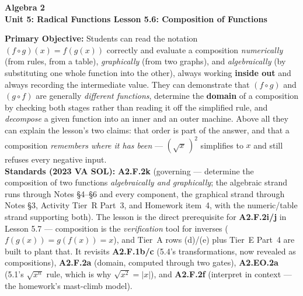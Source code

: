\documentclass[10pt]{article}
\newcommand{\CourseName}{Algebra 2}
\newcommand{\UnitNumberName}{Unit 5: Radical Functions \quad}
\newcommand{\LessonNumberName}{Lesson 5.6: Composition of Functions}
\begin{document}
\begin{center}
    {\Large\bfseries \CourseName \\
    {\small\bfseries \UnitNumberName \LessonNumberName}}
\end{center}

\begin{tcolorbox}[colback=forestbg, colframe=forest, boxrule=0.9pt, arc=2mm,
    left=2mm, right=2mm, top=1.5mm, bottom=1.5mm]
    \textbf{Primary Objective:} Students can read the notation $(f\circ g)(x)=f(g(x))$ correctly and
    evaluate a composition \emph{numerically} (from rules, from a table), \emph{graphically} (from
    two graphs), and \emph{algebraically} (by substituting one whole function into the other),
    always working \textbf{inside out} and always recording the intermediate value. They can
    demonstrate that $(f\circ g)$ and $(g\circ f)$ are generally \emph{different functions},
    determine the \textbf{domain} of a composition by checking both stages rather than reading it
    off the simplified rule, and \emph{decompose} a given function into an inner and an outer
    machine. Above all they can explain the lesson's two claims: that order is part of the answer,
    and that a composition \emph{remembers where it has been} --- $\left(\sqrt{x}\,\right)^{2}$
    simplifies to $x$ and still refuses every negative input.
    \\[2pt]
    \textbf{Standards (2023 VA SOL):} \textbf{A2.F.2k} (governing --- determine the composition of
    two functions \emph{algebraically and graphically}; the algebraic strand runs through Notes
    \S4--\S6 and every component, the graphical strand through Notes \S3, Activity Tier~R Part~3, and
    Homework item~4, with the numeric/table strand supporting both). The lesson is the direct
    prerequisite for \textbf{A2.F.2i/j} in Lesson 5.7 --- composition is the \emph{verification} tool
    for inverses ($f(g(x))=g(f(x))=x$), and Tier~A rows (d)/(e) plus Tier~E Part~4 are built to plant
    that. It revisits \textbf{A2.F.1b/c} (5.4's transformations, now revealed as compositions),
    \textbf{A2.F.2a} (domain, computed through two gates), \textbf{A2.EO.2a} (5.1's
    $\sqrt{x^{n}}$ rule, which is why $\sqrt{x^{2}}=|x|$), and \textbf{A2.F.2f} (interpret in
    context --- the homework's mast-climb model).
\end{tcolorbox}
\end{document}
